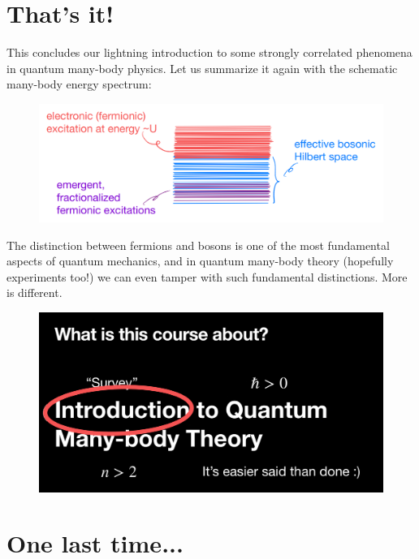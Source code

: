 \section{That's it!}

This concludes our lightning introduction to some strongly correlated phenomena in quantum many-body physics. Let us summarize it again with the schematic many-body energy spectrum:
\begin{figure}[H]
    \centering
    \includegraphics[width=\textwidth]{jupyterbook/data/fig/lec26-fig21.png}
\end{figure}
The distinction between fermions and bosons is one of the most fundamental aspects of quantum mechanics, and in quantum many-body theory (hopefully experiments too!) we can even tamper with such fundamental distinctions. More is different.
\begin{figure}[H]
    \centering
    \includegraphics[width=\textwidth]{jupyterbook/data/fig/lec26-fig22.png}
\end{figure}

\section{One last time...}

